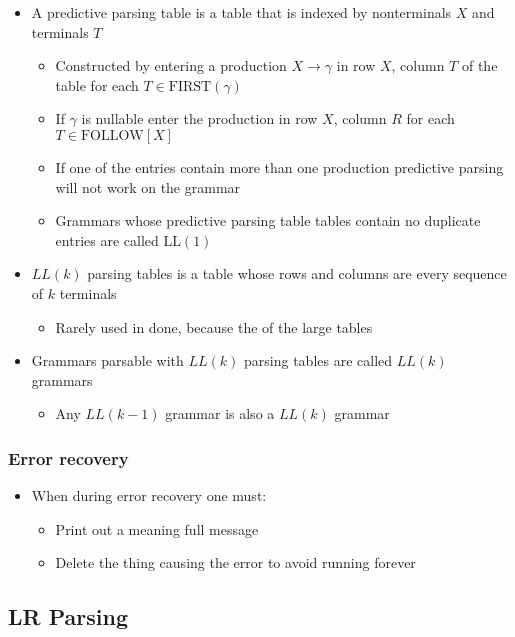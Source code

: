 \documentclass[11pt]{article}
\begin{document}
\begin{itemize}
\item A predictive parsing table is a table that is indexed by nonterminals \(X\) and terminals \(T\)
\begin{itemize}
\item Constructed by entering a production \(X \to \gamma\) in row \(X\), column \(T\) of the table for each \(T \in \text{FIRST}(\gamma)\)
\item If \(\gamma\) is nullable enter the production in row \(X\), column \(R\) for each \(T \in \text{FOLLOW}[X]\)
\item If one of the entries contain more than one production predictive parsing will not work on the grammar
\item Grammars whose predictive parsing table tables contain no duplicate entries are called \(\text{LL}(1)\)
\end{itemize}

\item \(LL(k)\) parsing tables is a table whose rows and columns are every sequence of \(k\) terminals
\begin{itemize}
\item Rarely used in done, because the of the large tables
\end{itemize}

\item Grammars parsable with \(LL(k)\) parsing tables are called \(LL(k)\) grammars
\begin{itemize}
\item Any \(LL(k-1)\) grammar is also a \(LL(k)\) grammar
\end{itemize}
\end{itemize}

\subsubsection{Error recovery}
\label{sec:orgece4f7f}
\begin{itemize}
\item When during error recovery one must:
\begin{itemize}
\item Print out a meaning full message
\item Delete the thing causing the error to avoid running forever
\end{itemize}
\end{itemize}

\subsection{LR Parsing}
\label{sec:org36d552a}
\end{document}

